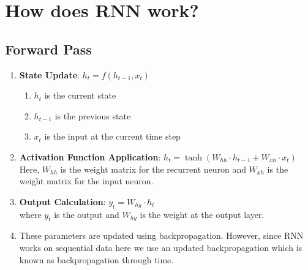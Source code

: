 \section{How does RNN work?}

\subsection*{Forward Pass}

\begin{enumerate}
    \item \textbf{State Update}: $h_t=f(h_{t-1},x_t)$
    \hfill \cite{geeksforgeeks/machine-learning/introduction-to-recurrent-neural-network}
    \begin{enumerate}
        \item $h_t$ is the current state
        \hfill \cite{geeksforgeeks/machine-learning/introduction-to-recurrent-neural-network}
        
        \item $h_{t-1}$ is the previous state
        \hfill \cite{geeksforgeeks/machine-learning/introduction-to-recurrent-neural-network}
        
        \item $x_t$ is the input at the current time step
        \hfill \cite{geeksforgeeks/machine-learning/introduction-to-recurrent-neural-network}
    \end{enumerate}

    \item \textbf{Activation Function Application}: $h_t=\tanh(W_{hh}\cdot h_{t-1}+W_{xh}\cdot x_t)$
    \hfill \cite{geeksforgeeks/machine-learning/introduction-to-recurrent-neural-network}
    \\
    Here, $W_{hh}$ is the weight matrix for the recurrent neuron and $W_{xh}$ is the weight matrix for the input neuron.
    \hfill \cite{geeksforgeeks/machine-learning/introduction-to-recurrent-neural-network}

    \item \textbf{Output Calculation}: $y_t=W_{hy}\cdot h_t$
    \hfill \cite{geeksforgeeks/machine-learning/introduction-to-recurrent-neural-network}
    \\
    where $y_t$ is the output and $W_{hy}$ is the weight at the output layer.
    \hfill \cite{geeksforgeeks/machine-learning/introduction-to-recurrent-neural-network}

    \item These parameters are updated using backpropagation. 
    However, since RNN works on sequential data here we use an updated backpropagation which is known as backpropagation through time.
    \hfill \cite{geeksforgeeks/machine-learning/introduction-to-recurrent-neural-network}
\end{enumerate}


